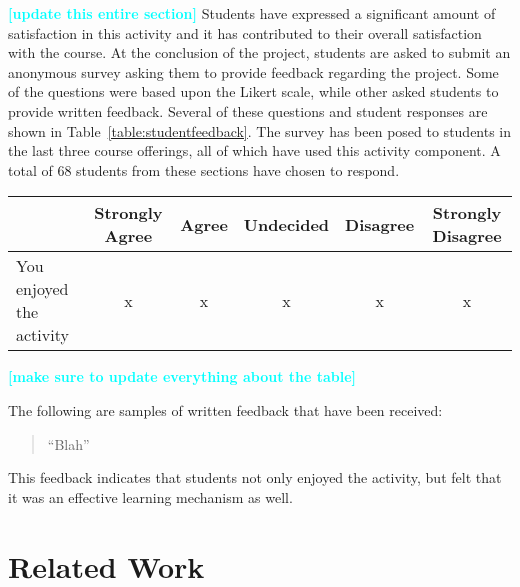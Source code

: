 \documentclass[conference]{IEEEtran}
\newcommand{\todo}[1]{\textcolor{cyan}{\textbf{[#1]}}}
\begin{document}
\todo{update this entire section}
Students have expressed a significant amount of satisfaction in this activity and it has contributed to their overall satisfaction with the course. At the conclusion of the project, students are asked to submit an anonymous survey asking them to provide feedback regarding the project. Some of the questions were based upon the Likert scale, while other asked students to provide written feedback. Several of these questions and student responses are shown in Table~\ref{table:studentfeedback}. The survey has been posed to students in the last three course offerings, all of which have used this activity component. A total of 68 students from these sections have chosen to respond.

\begin{table*}[t]
\caption{Student Responses}
\centering
    \begin{tabular}{ l | c | c | c | c | c     }

	\bfseries  & \bfseries Strongly Agree & \bfseries Agree & \bfseries Undecided & \bfseries Disagree  & \bfseries Strongly Disagree \\ \hline \hline

	 You enjoyed the activity & x & x & x & x  & x \\ \hline
	
    \end{tabular}

\label{table:studentfeedback}
\end{table*}
\todo{make sure to update everything about the table}





The following are samples of written feedback that have been received:

\begin{quotation}
``Blah''
\end{quotation}

This feedback indicates that students not only enjoyed the activity, but felt that it was an effective learning mechanism as well.

\section{Related Work}
\label{sec: relatedwork}
\end{document}

